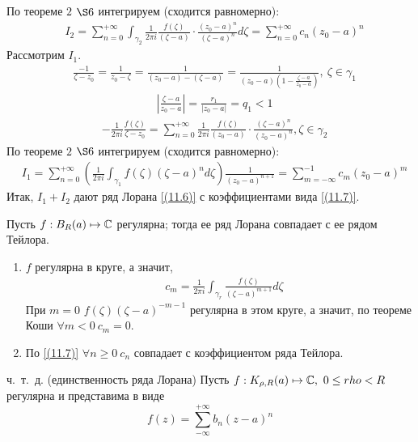 \begin{enumerate}
    По теореме $2$ $\S 6$ интегрируем (сходится равномерно):
    \begin{align*}
      & I_2 = \sum_{n=0}^{+\infty}\int_{\gamma_2} \frac{1}{2 \pi i}\frac{f(\zeta)}{(\zeta - a)}\cdot \frac{(z_0-a)^n}{(\zeta - a)^n} d\zeta = \sum_{n=0}^{+\infty} c_n(z_0-a)^n
    \end{align*}
    Рассмотрим $I_1$.
    \begin{align*}
      & \frac{-1}{\zeta - z_0} = \frac{1}{z_0-\zeta} = \frac{1}{(z_0 - a) - (\zeta-a)} = \frac{1}{(z_0 - a)\left( 1 - \frac{\zeta-a}{z_0-a} \right)}, \ \zeta \in \gamma_1
    \end{align*}
    \begin{align*}
      & \left| \frac{\zeta-a}{z_0 - a} \right| = \frac{r_1}{\left| z_0-a \right|} = q_1 < 1
    \end{align*}
    \begin{align*}
      & -\frac{1}{2 \pi i}\frac{f(\zeta)}{\zeta - z_0} = \sum_{n=0}^{+\infty}\frac{1}{2\pi i}\frac{f(\zeta)}{(z_0 - a)} \cdot \frac{(\zeta-a)^n}{(z_0 - a)^n}, \zeta \in \gamma_2
    \end{align*}
    По теореме $2$ $\S 6$ интегрируем (сходится равномерно):
    \begin{align*}
      & I_1 = \sum_{n=0}^{+\infty}\left( \frac{1}{2\pi i}\int_{\gamma_1}f(\zeta)(\zeta - a)^n d\zeta \right) \frac{1}{(z_0-a)^{n+1}} = \sum_{m = -\infty}^{-1}c_m(z_0-a)^m
    \end{align*}
    Итак, $I_1+I_2$ дают ряд Лорана \eqref{(11.6)} с коэффициентами вида \eqref{(11.7)}.
\end{enumerate}
\corollary
Пусть $f: B_R(a) \mapsto \mathbb{C}$ регулярна; тогда ее ряд Лорана совпадает с ее
рядом Тейлора.
\pr
\begin{enumerate}
    \item $f$ регулярна в круге, а значит,
    \begin{align*}
      & c_m = \frac{1}{2 \pi i}\int_{\gamma_r}\frac{f(\zeta)}{(\zeta - a)^{m+1}}d \zeta
    \end{align*}
    При $m = 0$ $f(\zeta)(\zeta - a)^{-m-1}$ регулярна в этом круге, а значит,
    по теореме Коши $\forall m < 0 \ c_m = 0$.
    \item По \eqref{(11.7)} $\forall n \geq  0 \ c_n$ совпадает с
    коэффициентом ряда Тейлора.
\end{enumerate}
ч.~т.~д.
\theorem (единственность ряда Лорана)
Пусть $f:K_{\rho,R}(a) \mapsto \mathbb{C}, \ 0 \leq rho < R$ регулярна и представима в
виде
\begin{equation}\label{(11.8)}
  f(z) = \sum_{-\infty}^{+\infty} b_n(z-a)^n
\end{equation}
